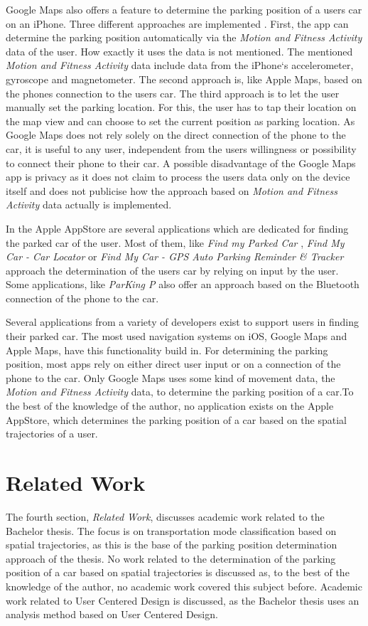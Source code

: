 Google Maps \cite{google:maps:app} also offers a feature to determine the parking position of a users car on an iPhone. Three different approaches are implemented \cite{google:maps:app:parkedcar}. First,  the app can determine the parking position automatically via the \textit{Motion and Fitness Activity} data of the user. How exactly it uses the data is not mentioned. The mentioned \textit{Motion and Fitness Activity} data include data from the iPhone`s accelerometer, gyroscope and magnetometer. The second approach is, like Apple Maps, based on the phones connection to the users car. The third approach is to let the user manually set the parking location. For this, the user has to tap their location on the map view and can choose to set the current position as parking location. 
As Google Maps does not rely solely on the direct connection of the phone to the car, it is useful to any user, independent from the users willingness or possibility to connect their phone to their car.  A possible disadvantage of the Google Maps app is privacy as it does not claim to process the users data only on the device itself and does not publicise how the approach based on \textit{Motion and Fitness Activity} data actually is implemented.

In the Apple AppStore are several applications which are dedicated for finding the parked car of the user. Most of them, like \textit{Find my Parked Car} \cite{miron:app}, \textit{Find My Car - Car Locator} \cite{babbar:app} or \textit{Find My Car - GPS Auto Parking Reminder \& Tracker} \cite{donner:app} approach the determination of the users car by relying on input by the user. Some applications, like \textit{ParKing P} \cite{porat:app} also offer an approach based on the Bluetooth connection of the phone to the car. 

Several applications from a variety of developers exist to support users in finding their parked car. The most used navigation systems on iOS, Google Maps and Apple Maps, have this functionality build in. For determining the parking position, most apps rely on either direct user input or on a connection of the phone to the car. Only Google Maps uses some kind of movement data, the \textit{Motion and Fitness Activity} data, to determine the parking position of a car.To the best of the knowledge of the author, no application exists on the Apple AppStore, which determines the parking position of a car based on the spatial trajectories of a user.


\section{Related Work}
The fourth section, \textit{Related Work}, discusses academic work related to the Bachelor thesis. The focus is on transportation mode classification based on spatial trajectories, as this is the base of the parking position determination approach of the thesis. No work related to the determination of the parking position of a car based on spatial trajectories is discussed as, to the best of the knowledge of the author, no academic work covered this subject before. Academic work related to User Centered Design is discussed, as the Bachelor thesis uses an analysis method based on User Centered Design. 

